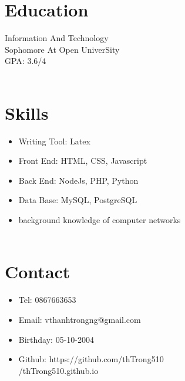 \documentclass[11pt,oneside,a4paper,titlepage]{article}
\begin{document}
\begin{tcolorbox}
    \begin{minipage}[t]{8cm}
        \vspace*{-0.5cm}
        \begin{tcolorbox}[grow to left by=0.6cm,colback=gray!25,colframe=white]
        \section*{Education}   
        Information And Technology\\
        Sophomore At Open UniverSity\\
        GPA: 3.6/4 \\ \\ 
        \section*{Skills}
        \begin{itemize}
        \item {Writing Tool: Latex}
        \item {Front End: HTML, CSS, Javascript}
        \item {Back End: NodeJs, PHP, Python}
        \item {Data Base: MySQL, PostgreSQL} 
        \item {background knowledge of computer networks} \\ \\
        \end{itemize} 
        \section*{Contact}
        \begin{itemize}
            \item {Tel: 0867663653}
            \item {Email: vthanhtrongng@gmail.com}
            \item {Birthday: 05-10-2004}
            \item {Github: https://github.com/thTrong510}\\
            /thTrong510.github.io \\ \\
        \end{itemize}

\end{tcolorbox}
\end{minipage}
\end{tcolorbox}
\end{document}
